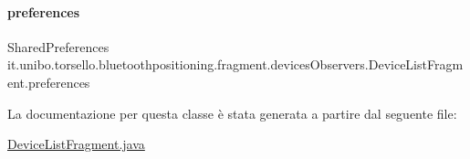 \hypertarget{classit_1_1unibo_1_1torsello_1_1bluetoothpositioning_1_1fragment_1_1devicesObservers_1_1DeviceListFragment_ac2b5a8b56dc71b8a217dbc37515e2052_ac2b5a8b56dc71b8a217dbc37515e2052}{}\label{classit_1_1unibo_1_1torsello_1_1bluetoothpositioning_1_1fragment_1_1devicesObservers_1_1DeviceListFragment_ac2b5a8b56dc71b8a217dbc37515e2052_ac2b5a8b56dc71b8a217dbc37515e2052} 
\paragraph{\texorpdfstring{preferences}{preferences}}
{\footnotesize\ttfamily Shared\+Preferences it.\+unibo.\+torsello.\+bluetoothpositioning.\+fragment.\+devices\+Observers.\+Device\+List\+Fragment.\+preferences\hspace{0.3cm}{\ttfamily [private]}}



La documentazione per questa classe è stata generata a partire dal seguente file\+:\begin{DoxyCompactItemize}
\item 
\hyperlink{DeviceListFragment_8java}{Device\+List\+Fragment.\+java}\end{DoxyCompactItemize}
